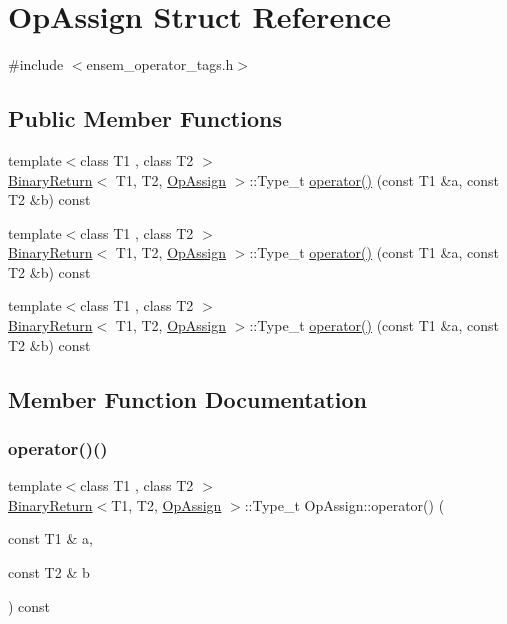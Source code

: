 \hypertarget{structOpAssign}{}\section{Op\+Assign Struct Reference}
\label{structOpAssign}


{\ttfamily \#include $<$ensem\+\_\+operator\+\_\+tags.\+h$>$}

\subsection*{Public Member Functions}
\begin{DoxyCompactItemize}
\item 
{\footnotesize template$<$class T1 , class T2 $>$ }\\\mbox{\hyperlink{structBinaryReturn}{Binary\+Return}}$<$ T1, T2, \mbox{\hyperlink{structOpAssign}{Op\+Assign}} $>$\+::Type\+\_\+t \mbox{\hyperlink{structOpAssign_a1fec7678b3c8924f7bac6a4feb4eb3d0}{operator()}} (const T1 \&a, const T2 \&b) const
\item 
{\footnotesize template$<$class T1 , class T2 $>$ }\\\mbox{\hyperlink{structBinaryReturn}{Binary\+Return}}$<$ T1, T2, \mbox{\hyperlink{structOpAssign}{Op\+Assign}} $>$\+::Type\+\_\+t \mbox{\hyperlink{structOpAssign_a1fec7678b3c8924f7bac6a4feb4eb3d0}{operator()}} (const T1 \&a, const T2 \&b) const
\item 
{\footnotesize template$<$class T1 , class T2 $>$ }\\\mbox{\hyperlink{structBinaryReturn}{Binary\+Return}}$<$ T1, T2, \mbox{\hyperlink{structOpAssign}{Op\+Assign}} $>$\+::Type\+\_\+t \mbox{\hyperlink{structOpAssign_a1fec7678b3c8924f7bac6a4feb4eb3d0}{operator()}} (const T1 \&a, const T2 \&b) const
\end{DoxyCompactItemize}


\subsection{Member Function Documentation}
\mbox{\label{structOpAssign_a1fec7678b3c8924f7bac6a4feb4eb3d0}} 
\subsubsection{\texorpdfstring{operator()()}{operator()()}\hspace{0.1cm}{\footnotesize\ttfamily [1/3]}}
{\footnotesize\ttfamily template$<$class T1 , class T2 $>$ \\
\mbox{\hyperlink{structBinaryReturn}{Binary\+Return}}$<$T1, T2, \mbox{\hyperlink{structOpAssign}{Op\+Assign}} $>$\+::Type\+\_\+t Op\+Assign\+::operator() (\begin{DoxyParamCaption}\item[{const T1 \&}]{a,  }\item[{const T2 \&}]{b }\end{DoxyParamCaption}) const\hspace{0.3cm}{\ttfamily [inline]}}

